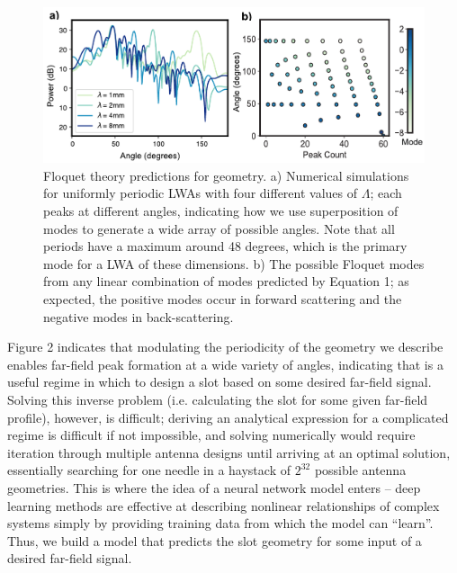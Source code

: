 \documentclass[11pt]{article}
\begin{document}
\begin{figure}[H]
	\centering
	\includegraphics[width=6in]{figures/theorypdf}
	\caption{Floquet theory predictions for geometry. a) Numerical simulations for uniformly periodic LWAs with four different values of $\Lambda$; each peaks at different angles, indicating how we use superposition of modes to generate a wide array of possible angles. Note that all periods have a maximum around 48 degrees, which is the primary mode for a LWA of these dimensions. b) The possible Floquet modes from any linear combination of modes predicted by Equation 1; as expected, the positive modes occur in forward scattering and the negative modes in back-scattering. }
\end{figure}

\noindent Figure 2 indicates that modulating the periodicity of the geometry we describe enables far-field peak formation at a wide variety of angles, indicating that is a useful regime in which to design a slot based on some desired far-field signal. Solving this inverse problem (i.e. calculating the slot for some given far-field profile), however, is difficult; deriving an analytical expression for a complicated regime is difficult if not impossible, and solving numerically would require iteration through multiple antenna designs until arriving at an optimal solution, essentially searching for one needle in a haystack of $2^{32}$ possible antenna geometries. This is where the idea of a neural network model enters -- deep learning methods are effective at describing nonlinear relationships of complex systems simply by providing training data from which the model can ``learn''. Thus, we build a model that predicts the slot geometry for some input of a desired far-field signal. \\
\end{document}
